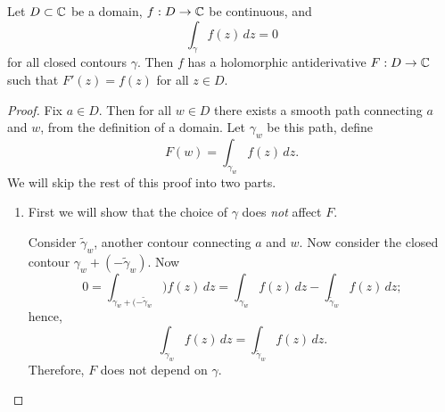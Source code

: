 \begin{theorem}
    Let $D \subset \mathbb{C}$ be a domain,
    $f: D \to \mathbb{C}$ be continuous, and
    \[
        \int_\gamma f(z) \, dz = 0
    \]
    for all closed contours $\gamma$.
    Then $f$ has a holomorphic antiderivative
    $F: D \to \mathbb{C}$
    such that
    $F'(z) = f(z)$
    for all $z \in D$.
\end{theorem}

\begin{proof}
    Fix $a \in D$.
    Then for all $w \in D$ there exists a smooth path connecting $a$ and $w$,
    from the definition of a domain.
    Let $\gamma_w$ be this path, define
    \[ F(w) = \int_{\gamma_w} f(z) \, dz. \]
    We will skip the rest of this proof into two parts.
    \begin{enumerate}
        \item
            First we will show that the choice of $\gamma$ does \emph{not}
            affect $F$.

            Consider $\tilde\gamma_w$, another contour connecting $a$ and $w$.
            Now consider the closed contour
            $\gamma_w + (-\tilde\gamma_w)$.
            Now
            \[ 
                0 
                = \int_{\gamma_w + (-\tilde\gamma_w}) f(z) \, dz
                = \int_{\gamma_w} f(z) \, dz - \int_{\tilde\gamma_w} f(z) \, dz; 
            \]
            hence,
            \[
                \int_{\gamma_w} f(z) \, dz = \int_{\tilde\gamma_w} f(z) \, dz.
            \]
            Therefore, $F$ does not depend on $\gamma$.


\end{enumerate}
\end{proof}
